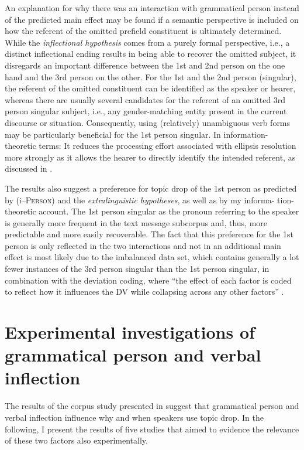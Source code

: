An explanation for why there was an interaction with grammatical person instead of the predicted main effect may be found if a semantic perspective is included on how the referent of the omitted prefield constituent is ultimately determined.
While the \textit{inflectional hypothesis} comes from a purely formal perspective, i.e., a distinct inflectional ending results in being able to recover  the omitted subject, it disregards an important difference between the 1st and 2nd person on the one hand and the 3rd person on the other.
For the 1st and the 2nd person (singular), the referent of the omitted constituent can be identified as the speaker or hearer, whereas there are usually several candidates for the referent of an omitted 3rd person singular subject, i.e., any gender-matching entity present in the current discourse or situation.
Consequently, using (relatively) unambiguous verb forms may be particularly beneficial for the 1st person singular. 
In information-theoretic terms:  
It reduces the processing effort  associated with ellipsis resolution more strongly as it allows the hearer to directly identify the intended referent, as discussed in .

The results also suggest a preference for topic drop of the 1st person as predicted by (i--\textsc{Person}) and the \textit{extralinguistic hypotheses}, as well as by my informa- tion-theoretic account.
The 1st person singular as the pronoun referring to the speaker is generally more frequent in the text message subcorpus and, thus, more predictable and more easily recoverable. 
The fact that this preference for the 1st person is only reflected in the two interactions and not in an additional main effect is most likely due to the imbalanced data set, which contains generally a lot fewer instances of the 3rd person singular than the 1st person singular, in combination with the deviation coding, where ``the effect of each factor is coded to reflect how it influences the DV while collapsing across any other factors'' \citep[3]{brehm.alday2022}.
 

\section{Experimental investigations of grammatical person and verbal inflection}\label{sec:usage.person.exp}
The results of the corpus study presented in  suggest that grammatical person and verbal inflection influence why and when speakers use topic drop.
In the following, I present the results of five studies that aimed to evidence the relevance of these two factors also experimentally.

